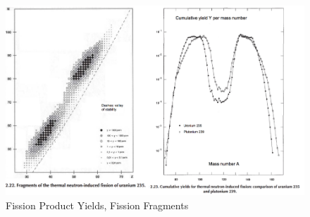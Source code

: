 \documentclass{school-22.211-notes}
\date{April  9, 2012}
\begin{document}
\maketitle

 \label{fission-product-poisoning}
\begin{figure}[ht]
  \centering
  \includegraphics[width=5in]{images/dfs/fission-product-yield.png}
  \caption{Fission Product Yields, Fission Fragments}
\end{figure}
\end{document}
